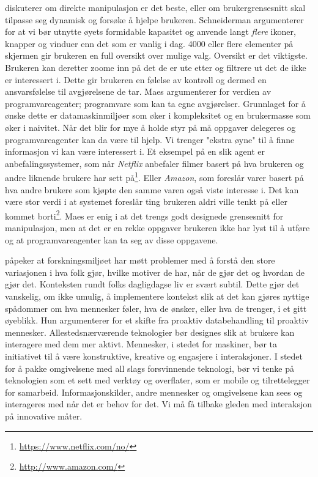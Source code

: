\citet{directmanipulation} diskuterer om direkte manipulasjon er det beste, eller om brukergrensesnitt skal tilpasse seg dynamisk og forsøke å hjelpe brukeren. Schneiderman argumenterer for at vi bør utnytte øyets formidable kapasitet og anvende langt \emph{flere} ikoner, knapper og vinduer enn det som er vanlig i dag. 4000 eller flere elementer på skjermen gir brukeren en full oversikt over mulige valg. Oversikt er det viktigste. Brukeren kan deretter zoome inn på det de er ute etter og filtrere ut det de ikke er interessert i. Dette gir brukeren en følelse av kontroll og dermed en ansvarsfølelse til avgjørelsene de tar. Maes argumenterer for verdien av programvareagenter; programvare som kan ta egne avgjørelser. Grunnlaget for å ønske dette er datamaskinmiljøer som øker i kompleksitet og en brukermasse som øker i naivitet. Når det blir for mye å holde styr på må oppgaver delegeres og programvareagenter kan da være til hjelp. Vi trenger "ekstra øyne" til å finne informasjon vi kan være interessert i. Et eksempel på en slik agent er anbefalingssystemer, som når \emph{Netflix} anbefaler filmer basert på hva brukeren og andre liknende brukere har sett på\footnote{\url{https://www.netflix.com/no/}}. Eller \emph{Amazon}, som foreslår varer basert på hva andre brukere som kjøpte den samme varen også viste interesse i. Det kan være stor verdi i at systemet foreslår ting brukeren aldri ville tenkt på eller kommet borti\footnote{\url{http://www.amazon.com/}}. Maes er enig i at det trengs godt designede grensesnitt for manipulasjon, men at det er en rekke oppgaver brukeren ikke har lyst til å utføre og at programvareagenter kan ta seg av disse oppgavene.

\citet{rogers06} påpeker at forskningsmiljøet har møtt problemer med å forstå den store variasjonen i hva folk gjør, hvilke motiver de har, når de gjør det og hvordan de gjør det. Konteksten rundt folks dagligdagse liv er svært subtil. Dette gjør det vanskelig, om ikke umulig, å implementere kontekst slik at det kan gjøres nyttige spådommer om hva mennesker føler, hva de ønsker, eller hva de trenger, i et gitt øyeblikk. Hun argumenterer for et skifte fra proaktiv databehandling til proaktiv mennesker. Allestedsnærværende teknologier bør designes slik at brukere kan interagere med dem mer aktivt. Mennesker, i stedet for maskiner, bør ta initiativet til å være konstruktive, kreative og engasjere i interaksjoner. I stedet for å pakke omgivelsene med all slags forsvinnende teknologi, bør vi tenke på teknologien som et sett med verktøy og overflater, som er mobile og tilrettelegger for samarbeid. Informasjonskilder, andre mennesker og omgivelsene kan sees og interageres med når det er behov for det. Vi må få tilbake gleden med interaksjon på innovative måter.

